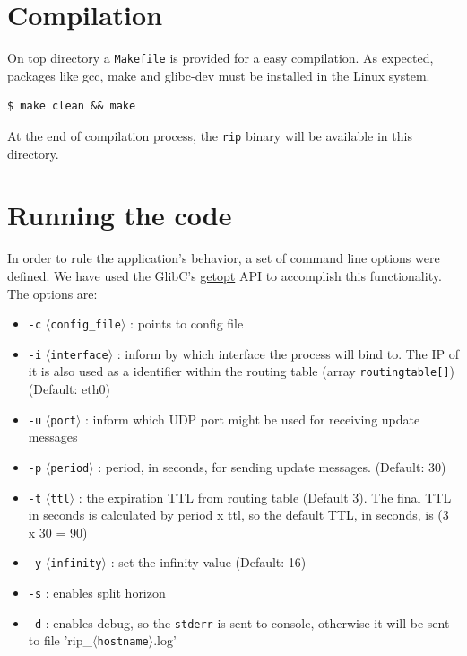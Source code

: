 \documentclass[10pt]{extarticle}
\newcommand{\abracket}[1]{$\langle$\texttt{#1}$\rangle$}
\begin{document}
\section{Compilation}

On top directory a \texttt{Makefile} is provided for a easy compilation. As
expected, packages like gcc, make and glibc-dev must be installed in the Linux
system.

\begin{Verbatim}
$ make clean && make
\end{Verbatim}

At the end of compilation process, the \texttt{rip} binary will be available in
this directory.

\section{Running the code}

In order to rule the application's behavior,  a set of command line options were
defined.          We           have          used           the          GlibC's
\href{http://www.gnu.org/software/libc/manual/html_node/Getopt.html}{getopt} API
to accomplish this functionality. The options are:

\begin{itemize}
\item{\texttt{-c}} \abracket{config\_file} : points to config file
\item{\texttt{-i}} \abracket{interface} : inform  by which interface the process
will bind to. The IP of it is also used as a identifier within the routing table
(array \texttt{routingtable[]}) (Default: eth0)
\item{\texttt{-u}} \abracket{port} : inform  which UDP port  might be  used for
receiving update messages
\item{\texttt{-p}} \abracket{period} : period,  in seconds, for  sending update
messages. (Default: 30)
\item{\texttt{-t}}  \abracket{ttl} :  the  expiration TTL  from  routing  table
(Default 3).  The final TTL  in seconds  is calculated by  period x ttl,  so the
default TTL, in seconds, is (3 x 30 = 90)
\item{\texttt{-y}}  \abracket{infinity} : set the infinity value (Default: 16)
\item{\texttt{-s}} : enables split horizon
\item{\texttt{-d}} : enables  debug, so the \texttt{stderr} is  sent to console,
otherwise it will be sent to file 'rip\_\abracket{hostname}.log'
\end{itemize}
\end{document}
